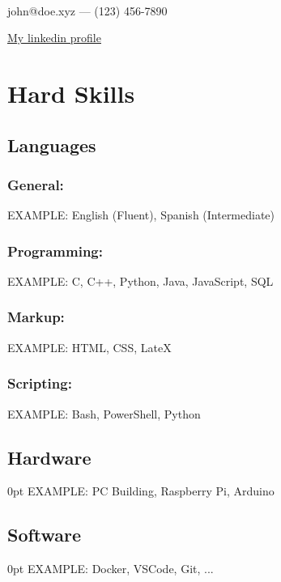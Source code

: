 \documentclass[a4paper,11pt]{article}
\makeatletter
\renewcommand{\maketitle}{
    \begin{center}
        {\Huge\bfseries\theauthor}\\[0.45em] %
        \vspace{.25em} %
        john@doe.xyz --- (123) 456-7890
        \centerline{\href{linkedin.com/in/johndoe}{My linkedin profile}}
    \end{center}
}
\newlength{\myindent}
\makeatother
\begin{document}
\author{John Doe}    
\maketitle

\section{ Hard Skills}
\vspace{-.8em}
    \subsection{Languages}
        \subsubsection{General:}
            EXAMPLE: English (Fluent), Spanish (Intermediate)
            \vspace{-.8em}
        \subsubsection{Programming:}
            EXAMPLE: C, C++, Python, Java, JavaScript, SQL
            \vspace{-.8em}    
        \subsubsection{Markup:}
            EXAMPLE: HTML, CSS, LateX
            \vspace{-.8em}
        \subsubsection{Scripting:}
            EXAMPLE: Bash, PowerShell, Python
            \vspace{-.8em}
    \subsection{Hardware}
        \begin{addmargin}[\myindent]{0pt}
            EXAMPLE: PC Building, Raspberry Pi, Arduino
        \end{addmargin}
        \vspace{-.8em}
    \subsection{Software}
        \begin{addmargin}[\myindent]{0pt}
            EXAMPLE: Docker, VSCode, Git, ...
        \end{addmargin}
        \vspace{-.25em}
\end{document}
